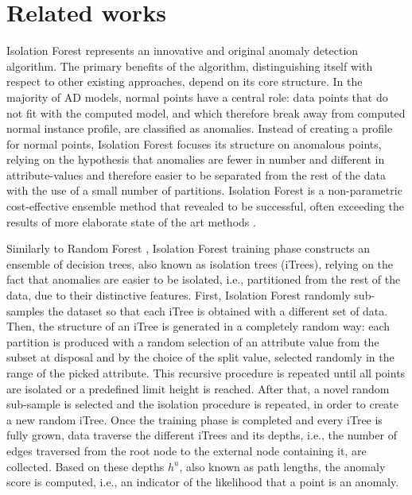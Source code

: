 \section{Related works}
\label{rw}
Isolation Forest \cite{liu2008isolation, liu2012isolation} represents an innovative and original anomaly detection algorithm. The primary benefits of the algorithm, distinguishing itself with respect to other existing approaches, depend on its core structure. In the majority of AD models, normal points have a central role: data points that do not fit with the computed model, and which therefore break away from computed normal instance profile, are classified as anomalies. Instead of creating a profile for normal points, Isolation Forest focuses its structure on anomalous points, relying on the hypothesis that anomalies are fewer in number and different in attribute-values and therefore easier to be separated from the rest of the data  with the use of a small number of partitions. Isolation Forest is a non-parametric cost-effective ensemble method that revealed to be successful, often exceeding the results of more elaborate state of the art methods \cite{susto2017anomaly}. 

Similarly to Random Forest \cite{ho1995random}, Isolation Forest training phase constructs an ensemble of decision trees, also known as isolation trees (iTrees), relying on the fact that anomalies are easier to be isolated, i.e., partitioned from the rest of the data, due to their distinctive features. First, Isolation Forest randomly sub-samples the dataset so that each iTree is obtained with a different set of data. Then, the structure of an iTree is generated in a completely random way: each partition is produced with a random selection of an attribute value from the subset at disposal and by the choice of the split value, selected randomly in the range of the picked attribute. This recursive procedure is repeated until all points are isolated or a predefined limit height is reached. After that, a novel random sub-sample is selected and the isolation procedure is repeated, in order to create a new random iTree. Once the training phase is completed and every iTree is fully grown, data traverse the different iTrees and its depths, i.e., the number of edges traversed from the root node to the external node containing it, are collected. Based on these depths $h^u$, also known as path lengths, the anomaly score is computed, i.e., an indicator of the likelihood that a point is an anomaly. 

